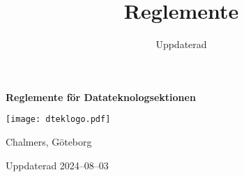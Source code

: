 \documentclass{dtek}
\title{Reglemente}
\date{Uppdaterad \updated}
\newcommand{\updated}{2024--08--03}
\begin{document}
\makeheadfoot%

\begin{center}
  {\Huge \textbf{Reglemente för Datateknologsektionen}}

  \texttt{[image: dteklogo.pdf]}

  {\LARGE Chalmers, Göteborg}

  \vspace{2cm}

  {\LARGE Uppdaterad \updated}
\end{center}

\newpage

\setcounter{tocdepth}{2}
\tableofcontents

\newpage

\end{document}
